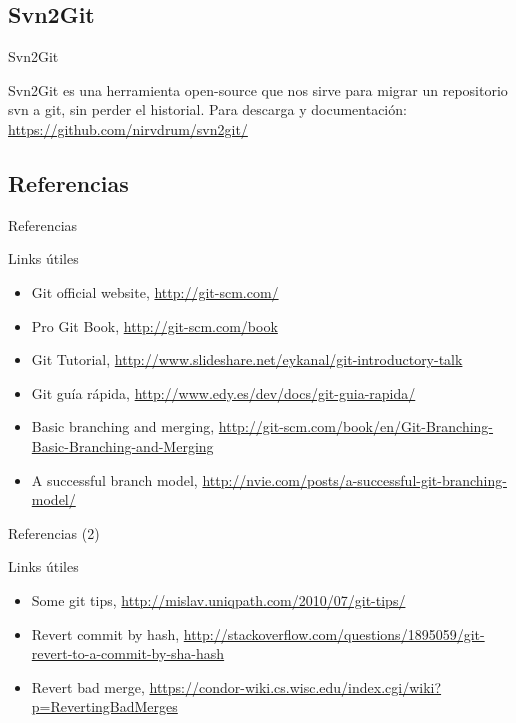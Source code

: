 \documentclass{beamer}
\begin{document}
\subsection{Svn2Git}

\begin{frame}{Svn2Git}
  \begin{block}{}
      Svn2Git es una herramienta open-source que nos sirve para migrar un repositorio svn a git, sin perder el historial.
      Para descarga y documentación: \url{https://github.com/nirvdrum/svn2git/}
  \end{block}

\end{frame}

\subsection{Referencias}

\begin{frame}{Referencias}
 \begin{block}{Links útiles}
    \begin{itemize}
     \item Git official website, \url{http://git-scm.com/}
     \item Pro Git Book, \url{http://git-scm.com/book}
     \item Git Tutorial, \url{http://www.slideshare.net/eykanal/git-introductory-talk}
     \item Git guía rápida, \url{http://www.edy.es/dev/docs/git-guia-rapida/}
     \item Basic branching and merging, \url{http://git-scm.com/book/en/Git-Branching-Basic-Branching-and-Merging}
     \item A successful branch model, \url{http://nvie.com/posts/a-successful-git-branching-model/}
    \end{itemize}

 \end{block}
\end{frame}

\begin{frame}{Referencias (2)}
 \begin{block}{Links útiles}
    \begin{itemize}
          \item Some git tips, \url{http://mislav.uniqpath.com/2010/07/git-tips/}
     \item Revert commit by hash, \url{http://stackoverflow.com/questions/1895059/git-revert-to-a-commit-by-sha-hash}
     \item Revert bad merge, \url{https://condor-wiki.cs.wisc.edu/index.cgi/wiki?p=RevertingBadMerges}
    \end{itemize}

 \end{block}
\end{frame}
\end{document}
